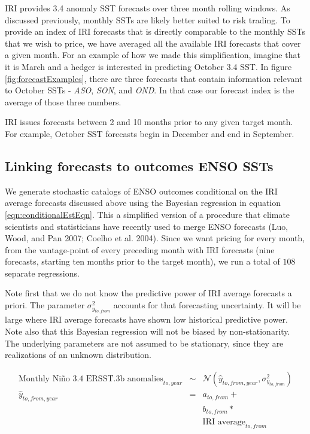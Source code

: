 \documentclass[article]{jss}
\begin{document}
IRI provides  3.4 anomaly SST forecasts over three month
rolling windows. As discussed previously, monthly SSTs are likely better
suited to risk trading. To provide an index of IRI forecasts that is
directly comparable to the monthly SSTs that we wish to price, we have
averaged all the available IRI forecasts that cover a given month. For
an example of how we made this simplification, imagine that it is March
and a hedger is interested in predicting October  3.4 SST.
In figure \ref{fig:forecastExamples}, there are three forecasts that
contain information relevant to October SSTs - \emph{ASO}, \emph{SON},
and \emph{OND}. In that case our forecast index is the average of those
three numbers.

IRI issues forecasts between 2 and 10 months prior to any given target
month. For example, October SST forecasts begin in December and end in
September.

\subsection{Linking forecasts to outcomes ENSO
SSTs}\label{linking-forecasts-to-outcomes-enso-ssts}

We generate stochastic catalogs of ENSO outcomes conditional on the IRI
average forecasts discussed above using the Bayesian regression in
equation \ref{eqn:conditionalEstEqn}. This a simplified version of a
procedure that climate scientists and statisticians have recently used
to merge ENSO forecasts (Luo, Wood, and Pan 2007; Coelho et al. 2004).
Since we want pricing for every month, from the vantage-point of every
preceding month with IRI forecasts (nine forecasts, starting ten months
prior to the target month), we run a total of \(108\) separate
regressions.

Note first that we do not know the predictive power of IRI average
forecasts a priori. The parameter \(\sigma_{y_{to,from}}^2\) accounts
for that forecasting uncertainty. It will be large where IRI average
forecasts have shown low historical predictive power. Note also that
this Bayesian regression will not be biased by non-stationarity. The
underlying parameters are not assumed to be stationary, since they are
realizations of an unknown distribution.

\begin{equation}
\begin{array}{lcl}
\mbox{Monthly Ni\~no 3.4 ERSST.3b anomalies}_{to,year} & \sim & \mathcal{N}( \hat{y}_{to,from,year}, \sigma_{y_{to,from}}^2 )\\
\hat{y}_{to,from,year} & = & a_{to,from}+\\
&& b_{to,from}*\\
&& \mbox{IRI average}_{to,from}\\
\end{array}
\label{eqn:conditionalEstEqn}
\end{equation}
\end{document}
